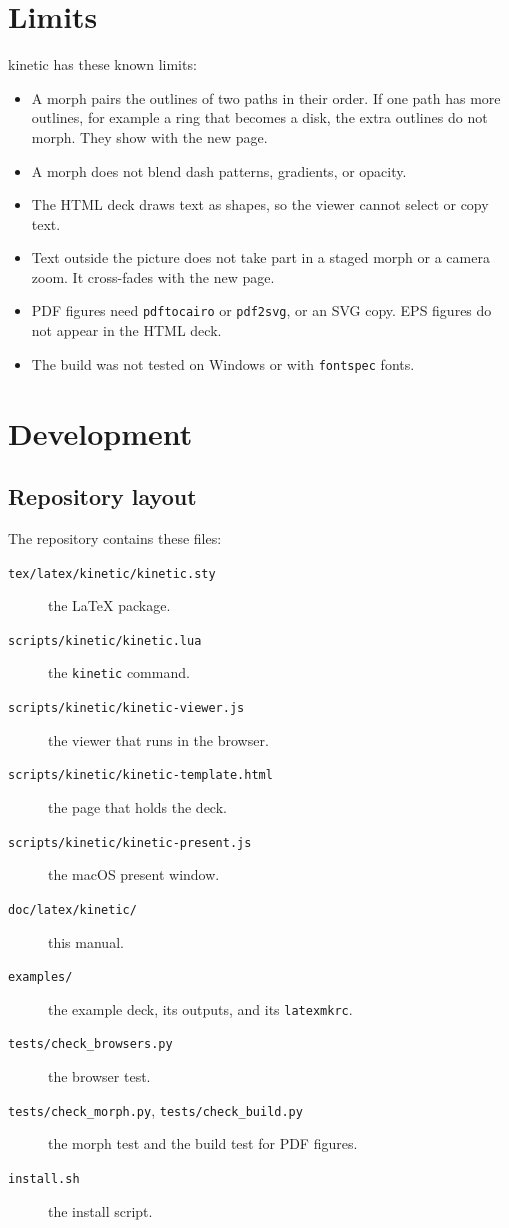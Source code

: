 \documentclass[11pt]{article}
\newcommand{\pkg}{\textsf{kinetic}}
\newcommand{\cmd}[1]{\texttt{#1}}
\begin{document}
\section{Limits}

\pkg{} has these known limits:
\begin{itemize}
	\item A morph pairs the outlines of two paths in their order. If one path has
	      more outlines, for example a ring that becomes a disk, the extra outlines do
	      not morph. They show with the new page.
	\item A morph does not blend dash patterns, gradients, or opacity.
	\item The HTML deck draws text as shapes, so the viewer cannot select or copy
	      text.
	\item Text outside the picture does not take part in a staged morph or a camera
	      zoom. It cross-fades with the new page.
	\item PDF figures need \cmd{pdftocairo} or \cmd{pdf2svg}, or an SVG copy. EPS figures do not appear in the HTML deck.
	\item The build was not tested on Windows or with \cmd{fontspec} fonts.
\end{itemize}

\section{Development}

\subsection{Repository layout}

The repository contains these files:
\begin{description}
	\item[\cmd{tex/latex/kinetic/kinetic.sty}] the LaTeX package.
	\item[\cmd{scripts/kinetic/kinetic.lua}] the \cmd{kinetic} command.
	\item[\cmd{scripts/kinetic/kinetic-viewer.js}] the viewer that runs in the browser.
	\item[\cmd{scripts/kinetic/kinetic-template.html}] the page that holds the deck.
	\item[\cmd{scripts/kinetic/kinetic-present.js}] the macOS present window.
	\item[\cmd{doc/latex/kinetic/}] this manual.
	\item[\cmd{examples/}] the example deck, its outputs, and its \cmd{latexmkrc}.
	\item[\cmd{tests/check\_browsers.py}] the browser test.
	\item[\cmd{tests/check\_morph.py}, \cmd{tests/check\_build.py}] the morph test and the build test for PDF figures.
	\item[\cmd{install.sh}] the install script.
\end{description}
\end{document}
